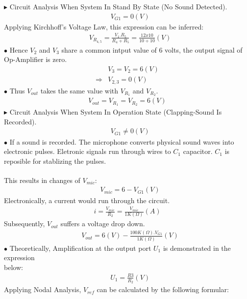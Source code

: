 \documentclass[12pt]{extarticle}
\newcommand{\<}{\langle}
\newcommand\tab[1][1cm]{\hspace*{#1}}
\renewcommand{\>}{\rangle}
\theoremstyle{definition}
\begin{document}
\begin{normalsize}
\tab $\blacktriangleright$ Circuit Analysis When System In Stand By State (No Sound Detected).
\begin{align*}
&V_{G1} = 0(V)
\end{align*}
Applying Kirchhoff's Voltage Law, this expression can be inferred:
\begin{align*}
&V_{R_{4,5}} = \frac{V_1 . R_5}{R_4 + R_5} = \frac{12x10}{10 + 10} (V)
\end{align*}
$\bullet$ Hence $V_2$ and $V_3$ share a common intput value of 6 volts, the output signal of\\Op-Amplifier is zero.  
\begin{align*}
&V_3 = V_2 = 6 (V)\\ 
\Longrightarrow &V_{2,3} = 0 (V)
\end{align*}
$\bullet$ Thus $V_{out}$ takes the same value with $V_{R_1}$ and $V_{R_2}$.
\begin{align*}
V_{out} = V_{R_1} = V_{R_2} = 6 (V)
\end{align*}
\tab $\blacktriangleright$ Circuit Analysis When System In Operation State (Clapping-Sound Is Recorded).
\begin{align*}
&V_{G1} \neq 0 (V)
\end{align*}
$\bullet$ If a sound is recorded. The microphone converts physical sound waves into electronic pulses. Eletronic signals run through wires to $C_1$ capacitor. $C_1$ is reposible for stablizing the pulses.\\
\\
This results in changes of $V_{mic}$:
\begin{align*}
&V_{mic} = 6 - V_{G1} (V)
\end{align*}
Electronically, a current would run through the circuit.
\begin{align*}
i = \frac{V_{mic}}{R_2} = \frac{V_{mic}}{1K(\Omega)} (A)
\end{align*}
Subsequently, $V_{out}$ suffers a voltage drop down.
\begin{align*}
&V_{out} = 6(V) - \frac{100K(\Omega).V_{G1}}{1K(\Omega)} (V)
\end{align*}
$\bullet $ Theoretically, Amplification at the output port $U_1$ is demonstrated in the expression\\below:
\begin{align*}
&U_1 = \frac{R3}{R_2} (V)
\end{align*}
Applying Nodal Analysis, $V_{ref}$ can be calculated by the following formular:

\end{normalsize}
\end{document}
